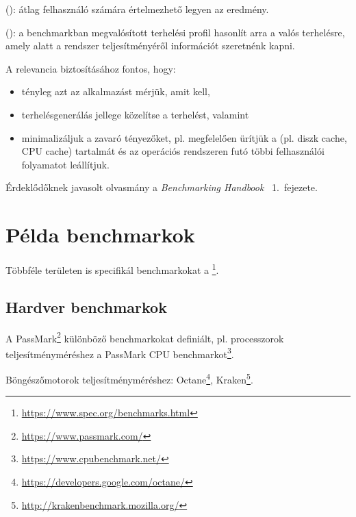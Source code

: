 \begin{definicio}
	 (): átlag felhasználó számára értelmezhető legyen az eredmény.
\end{definicio}

\begin{definicio}
	 (): a benchmarkban megvalósított terhelési profil hasonlít arra a valós terhelésre, amely alatt a rendszer teljesítményéről információt szeretnénk kapni.
\end{definicio}

A relevancia biztosításához fontos, hogy:

\begin{itemize}
	\item tényleg azt az alkalmazást mérjük, amit kell,
	\item terhelésgenerálás jellege közelítse a  terhelést, valamint
	\item minimalizáljuk a zavaró tényezőket, pl. megfelelően ürítjük a  (pl. diszk cache, CPU cache) tartalmát és az operációs rendszeren futó többi felhasználói folyamatot leállítjuk.
\end{itemize}


\begin{megjegyzes}
Érdeklődőknek javasolt olvasmány a \emph{Benchmarking Handbook}~\cite{DBLP:books/mk/Gray93} 1.~fejezete.
\end{megjegyzes}	


\section{Példa benchmarkok\kieg}

Többféle területen is specifikál benchmarkokat a \footnote{\url{https://www.spec.org/benchmarks.html}}.

\subsection{Hardver benchmarkok}

A PassMark\footnote{\url{https://www.passmark.com/}} különböző benchmarkokat definiált, pl. processzorok teljesítményméréshez a PassMark CPU benchmarkot\footnote{\url{https://www.cpubenchmark.net/}}.

Böngészőmotorok teljesítményméréshez: Octane\footnote{\url{https://developers.google.com/octane/}},
Kraken\footnote{\url{http://krakenbenchmark.mozilla.org/}}.

